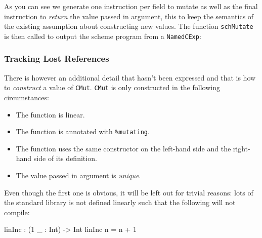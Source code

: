 \documentclass[
]{article}
\newenvironment{Shaded}{}{}
\newcommand{\DataTypeTok}[1]{\textcolor[rgb]{0.56,0.13,0.00}{#1}}
\newcommand{\DecValTok}[1]{\textcolor[rgb]{0.25,0.63,0.44}{#1}}
\newcommand{\FunctionTok}[1]{\textcolor[rgb]{0.02,0.16,0.49}{#1}}
\newcommand{\NormalTok}[1]{#1}
\newcommand{\OperatorTok}[1]{\textcolor[rgb]{0.40,0.40,0.40}{#1}}
\newcommand{\OtherTok}[1]{\textcolor[rgb]{0.00,0.44,0.13}{#1}}
\providecommand{\tightlist}{%
  \setlength{\itemsep}{0pt}\setlength{\parskip}{0pt}}
\begin{document}
As you can see we generate one instruction per field to mutate as well
as the final instruction to \emph{return} the value passed in argument,
this to keep the semantics of the existing assumption about constructing
new values. The function \texttt{schMutate} is then called to output the
scheme program from a \texttt{NamedCExp}:

\begin{Shaded}
\end{Shaded}

\hypertarget{tracking-lost-references}{%
\subsubsection{Tracking Lost
References}\label{tracking-lost-references}}

There is however an additional detail that hasn't been expressed and
that is how to \emph{construct} a value of \texttt{CMut}. \texttt{CMut}
is only constructed in the following circumstances:

\begin{itemize}
\tightlist
\item
  The function is linear.
\item
  The function is annotated with \texttt{\%mutating}.
\item
  The function uses the same constructor on the left-hand side and the
  right-hand side of its definition.
\item
  The value passed in argument is \emph{unique}.
\end{itemize}

Even though the first one is obvious, it will be left out for trivial
reasons: lots of the standard library is not defined linearly such that
the following will not compile:

\begin{Shaded}
\begin{Highlighting}[]
\NormalTok{linInc }\OperatorTok{:}\NormalTok{ (}\DecValTok{1}\NormalTok{ \_ }\OperatorTok{:} \DataTypeTok{Int}\NormalTok{) }\OtherTok{{-}\textgreater{}} \DataTypeTok{Int}
\NormalTok{linInc n }\OtherTok{=}\NormalTok{ n }\OperatorTok{+} \DecValTok{1}
\end{Highlighting}
\end{Shaded}
\end{document}
